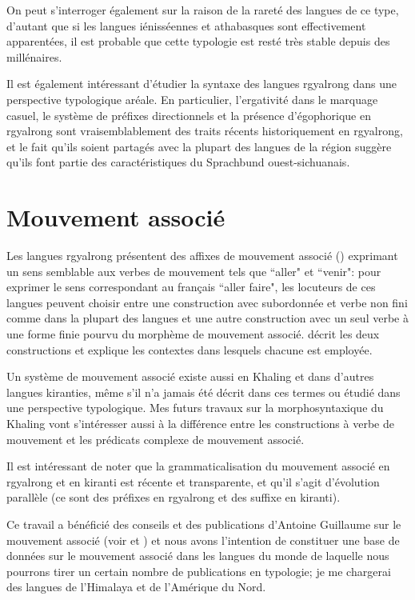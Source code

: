 \documentclass[oldfontcommands,oneside,a4paper,11pt]{memoir}
\begin{document}
On peut s'interroger également sur la raison de la rareté des langues de ce type, d'autant que si les langues iénisséennes et athabasques sont effectivement apparentées, il est probable que cette typologie est resté très stable depuis des millénaires.

 
Il est également intéressant d'étudier la syntaxe des langues rgyalrong dans une perspective typologique aréale. En particulier,  l'ergativité dans le marquage casuel, le système de préfixes directionnels  et la présence d'égophorique en rgyalrong sont vraisemblablement des traits récents historiquement en rgyalrong, et le fait qu'ils soient partagés avec la plupart des langues de la région suggère qu'ils font partie  des caractéristiques du Sprachbund ouest-sichuanais.

\section{Mouvement associé}
Les langues rgyalrong  présentent des affixes de mouvement associé (\citealt{jacques13harmonization}) exprimant un sens semblable aux verbes de mouvement tels que ``aller" et ``venir": pour exprimer le sens correspondant au français ``aller faire", les locuteurs de ces langues peuvent choisir entre une construction avec subordonnée et verbe non fini comme dans la plupart des langues et une autre construction avec un seul verbe à une forme finie pourvu du morphème de mouvement associé. \citet{jacques13harmonization} décrit les deux constructions et explique les contextes dans lesquels chacune  est employée. 

Un système de mouvement associé existe aussi en Khaling et dans d'autres langues kiranties, même s'il n'a jamais été décrit dans ces termes ou étudié dans une perspective typologique. Mes futurs travaux sur la morphosyntaxique du Khaling vont s'intéresser aussi à la différence entre les constructions à verbe de mouvement et les prédicats complexe de mouvement associé. 

Il est intéressant de noter que la grammaticalisation du mouvement associé en rgyalrong et en kiranti est récente et transparente, et qu'il s'agit d'évolution parallèle (ce sont des préfixes en rgyalrong et des suffixe en kiranti).

Ce travail a bénéficié des conseils et des publications d'Antoine Guillaume sur le mouvement associé (voir \citealt{guillaume.associated.motion} et \citealt{guillaume09mouv.assoc}) et nous avons l'intention de constituer une base de données sur le mouvement associé dans les langues du monde de laquelle nous pourrons tirer un certain nombre de publications en typologie; je me chargerai des langues de l'Himalaya et de l'Amérique du Nord.
\end{document}
